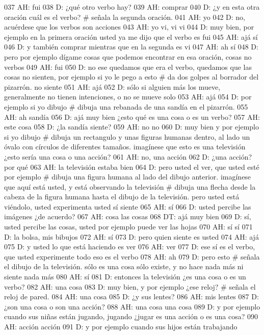037 AH: fui
038 D: ¿qué otro verbo hay?
039 AH: comprar
040 D: ¿y en esta otra oración cuál es el verbo? # señala la segunda oración.
041 AH: yo
042 D: no, acuérdese que los verbos son acciones
043 AH: yo vi, vi vi
044 D: muy bien, por ejemplo en la primera oración usted ya me dijo que el verbo es fui
045 AH: ajá sí
046 D: y también comprar mientras que en la segunda es vi
047 AH: ah sí
048 D: pero por ejemplo dígame cosas que podemos encontrar en esa oración, cosas no verbos
049 AH: fui
050 D: no ese quedamos que era el verbo, quedamos que las cosas no sienten, por ejemplo si yo le pego a esto # da dos golpes al borrador del pizarrón. no siente
051 AH: ajá
052 D: sólo si alguien más los mueve, generalmente no tienen intenciones, o no se mueve solo
053 AH: ajá
054 D: por ejemplo si yo dibujo # dibuja una rebanada de una sandía en el pizarrón.
055 AH: ah sandía
056 D: ajá muy bien ¿esto qué es una cosa o es un verbo?
057 AH: este cosa
058 D: ¿la sandía siente?
059 AH: no no
060 D: muy bien y por ejemplo si yo dibujo # dibuja un rectangulo y unas figuras humanas dentro, al lado un óvalo con círculos de diferentes tamaños. imagínese que esto es una televisión ¿esto sería una cosa o una acción?
061 AH: no, una acción
062 D: ¿una acción? por qué
063 AH: la televisión estaba bien
064 D: pero usted el ver, que usted esté por ejemplo # dibuja una figura humana al lado del dibujo anterior. imagínese que aquí está usted, y está observando la televisión # dibuja una flecha desde la cabeza de la figura humana hasta el dibujo de la televisión. pero usted está viéndolo, usted experimenta usted sí siente
065 AH: sí
066 D: usted percibe las imágenes ¿de acuerdo?
067 AH: cosa las cosas
068 DT: ajá muy bien
069 D: sí, usted percibe las cosas, usted por ejemplo puede ver las hojas
070 AH: sí sí
071 D: la bolsa, mis bibujos
072 AH: sí
073 D: pero quien siente es usted
074 AH: ajá
075 D: y usted lo que está haciendo es ver
076 AH: ver
077 D: ese sí es el verbo, que usted experimente todo eso es el verbo
078 AH: ah
079 D: pero esto # señala el dibujo de la televisión. sólo es una cosa sólo existe, y no hace nada más ni siente nada más
080 AH: sí
081 D: entonces la televisión ¿es una cosa o es un verbo?
082 AH: una cosa
083 D: muy bien, y por ejemplo ¿ese reloj? # señala el reloj de pared.
084 AH: una cosa
085 D: ¿y sus lentes?
086 AH: mis lentes
087 D: ¿son una cosa o son una acción?
088 AH: una cosa una cosa
089 D: y por ejemplo cuando sus niñas están jugando, jugando ¿jugar es una acción o es una cosa?
090 AH: acción acción
091 D: y por ejemplo cuando sus hijos están trabajando
